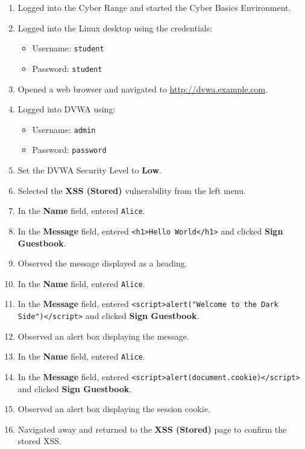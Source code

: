 \documentclass[12pt]{article}
\begin{document}
\begin{enumerate}
    \item Logged into the Cyber Range and started the Cyber Basics Environment.
    \item Logged into the Linux desktop using the credentials:
    \begin{itemize}
        \item Username: \texttt{student}
        \item Password: \texttt{student}
    \end{itemize}
    \item Opened a web browser and navigated to \url{http://dvwa.example.com}.
    \item Logged into DVWA using:
    \begin{itemize}
        \item Username: \texttt{admin}
        \item Password: \texttt{password}
    \end{itemize}
    \item Set the DVWA Security Level to \textbf{Low}.
    \item Selected the \textbf{XSS (Stored)} vulnerability from the left menu.
    \item In the \textbf{Name} field, entered \texttt{Alice}.
    \item In the \textbf{Message} field, entered \texttt{<h1>Hello World</h1>} and clicked \textbf{Sign Guestbook}.
    \item Observed the message displayed as a heading.
    \item In the \textbf{Name} field, entered \texttt{Alice}.
    \item In the \textbf{Message} field, entered \texttt{<script>alert("Welcome to the Dark Side")</script>} and clicked \textbf{Sign Guestbook}.
    \item Observed an alert box displaying the message.
    \item In the \textbf{Name} field, entered \texttt{Alice}.
    \item In the \textbf{Message} field, entered \texttt{<script>alert(document.cookie)</script>} and clicked \textbf{Sign Guestbook}.
    \item Observed an alert box displaying the session cookie.
    \item Navigated away and returned to the \textbf{XSS (Stored)} page to confirm the stored XSS.
\end{enumerate}
\end{document}
